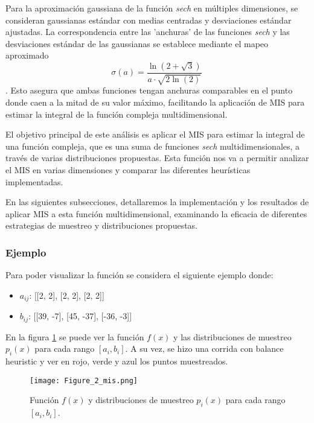 \documentclass{article}
\begin{document}
Para la aproximación gaussiana de la función \textit{sech} en múltiples dimensiones, se consideran gaussianas estándar con medias centradas y desviaciones estándar ajustadas.
La correspondencia entre las 'anchuras' de las funciones \textit{sech} y las desviaciones estándar de las gaussianas se establece mediante el mapeo aproximado $$ \sigma(a) = \frac{\ln(2 + \sqrt{3})}{a \cdot \sqrt{2\ln(2)}} \ $$.
Esto asegura que ambas funciones tengan anchuras comparables en el punto donde caen a la mitad de su valor máximo, facilitando la aplicación de MIS para estimar la integral de la función compleja multidimensional.


El objetivo principal de este análisis es aplicar el MIS para estimar la integral de una función compleja, que es una suma de funciones \textit{sech} multidimensionales, a través de varias distribuciones propuestas.
Esta función nos va a permitir analizar el MIS en varias dimensiones y comparar las diferentes heurísticas implementadas.

En las siguientes subsecciones, detallaremos la implementación y los resultados de aplicar MIS a esta función multidimensional, examinando la eficacia de diferentes estrategias de muestreo y distribuciones propuestas.

\subsubsection{Ejemplo}

Para poder visualizar la función se considera el siguiente ejemplo donde:

\begin{itemize}
    \item \textbf{\( a_{ij} \)}: [[2, 2], [2, 2], [2, 2]]
    \item \textbf{\( b_{ij} \)}: [[39, -7], [45, -37], [-36, -3]]
\end{itemize}

En la figura \ref{fig:mis2} se puede ver la función \( f(x) \) y las distribuciones de muestreo \( p_{i}(x) \) para cada rango \( [a_{i}, b_{i}] \).
A su vez, se hizo una corrida con balance heuristic y ver en rojo, verde y azul los puntos muestreados.

\begin{figure}[H]
\texttt{[image: Figure\_2\_mis.png]}
\caption{Función \( f(x) \) y distribuciones de muestreo \( p_{i}(x) \) para cada rango \( [a_{i}, b_{i}] \).}
\label{fig:mis2}
\end{figure}
\end{document}
